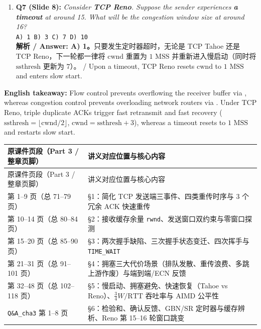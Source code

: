 \begin{enumerate}
\item \textbf{Q7 (Slide 8):} \emph{Consider \textbf{TCP Reno}. Suppose the sender experiences \textbf{a timeout} at around 15. What will be the congestion window size at around 16?} \\
\texttt{A) 1 \quad B) 3 \quad C) 7 \quad D) 10} \\
\textbf{解析 / Answer: A) 1。}只要发生定时器超时，无论是 TCP Tahoe 还是 TCP Reno，下一轮都一律将 $\mathrm{cwnd}$ 重置为 $1\text{ MSS}$ 并重新进入慢启动（同时将 $\mathrm{ssthresh}$ 更新为 $7$）。 / Upon a timeout, TCP Reno resets $\mathrm{cwnd}$ to $1\text{ MSS}$ and enters slow start.
\end{enumerate}

\textbf{English takeaway:} Flow control prevents overflowing the receiver buffer via , whereas congestion control prevents overloading network routers via . Under TCP Reno, triple duplicate ACKs trigger fast retransmit and fast recovery ($\mathrm{ssthresh}=\lfloor \mathrm{cwnd}/2\rfloor$, $\mathrm{cwnd}=\mathrm{ssthresh}+3$), whereas a timeout resets  to $1\text{ MSS}$ and restarts slow start.



\begingroup\small\setlength{\tabcolsep}{3pt}\renewcommand{\arraystretch}{1.22}
\begin{longtable}{@{}>{\raggedright\arraybackslash}p{}>{\raggedright\arraybackslash}p{}@{}}
\toprule
原课件页段（Part 3 / 整章页脚） & 讲义对应位置与核心内容 \\
\midrule\endfirsthead
原课件页段（Part 3 / 整章页脚） & 讲义对应位置与核心内容 \\
\midrule\endhead
\bottomrule\endfoot
第 1–9 页（总 71–79 页） & §1：简化 TCP 发送端三事件、四类重传时序与 3 个冗余 ACK 快速重传 \\
第 10–14 页（总 80–84 页） & §2：接收缓存余量 \texttt{rwnd}、发送窗口双约束与零窗口探测 \\
第 15–20 页（总 85–90 页） & §3：两次握手缺陷、三次握手状态变迁、四次挥手与 \texttt{TIME\_WAIT} \\
第 21–31 页（总 91–101 页） & §4：拥塞三大代价场景（排队发散、重传浪费、多跳上游作废）与端到端/ECN 反馈 \\
第 32–48 页（总 102–118 页） & §5：慢启动、拥塞避免、快速恢复（Tahoe vs Reno）、$\frac{3}{4}W/\mathrm{RTT}$ 吞吐率与 AIMD 公平性 \\
\texttt{Q\&A\_cha3} 第 1–8 页 & §6：检验和、确认反馈、GBN/SR 定时器与缓存辨析、Reno 第 15–16 轮窗口跳变 \\
\end{longtable}\endgroup
